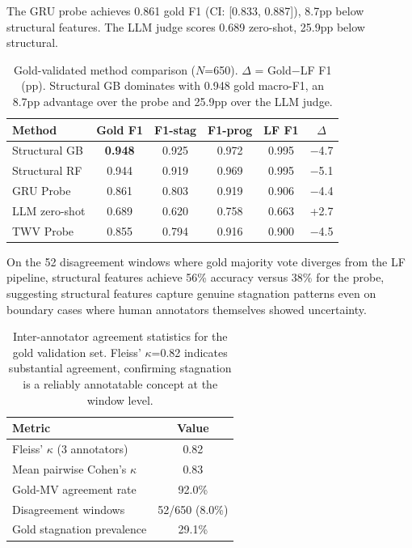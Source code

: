 \documentclass[11pt,a4paper]{article}
\begin{document}
The GRU probe achieves 0.861 gold F1 (CI: [0.833, 0.887]), 8.7pp below structural features.
The LLM judge scores 0.689 zero-shot, 25.9pp below structural.

\begin{table}[t]
\centering
\small
\begin{tabular}{lccccc}
\toprule
\textbf{Method} & \textbf{Gold F1} & \textbf{F1-stag} & \textbf{F1-prog} & \textbf{LF F1} & \textbf{$\Delta$} \\
\midrule
Structural GB   & \textbf{0.948} & 0.925 & 0.972 & 0.995 & $-$4.7 \\
Structural RF   & 0.944 & 0.919 & 0.969 & 0.995 & $-$5.1 \\
GRU Probe       & 0.861 & 0.803 & 0.919 & 0.906 & $-$4.4 \\
LLM zero-shot   & 0.689 & 0.620 & 0.758 & 0.663 & +2.7 \\
TWV Probe       & 0.855 & 0.794 & 0.916 & 0.900 & $-$4.5 \\
\bottomrule
\end{tabular}
\caption{Gold-validated method comparison ($N$=650). $\Delta$ = Gold$-$LF F1 (pp). Structural GB dominates with 0.948 gold macro-F1, an 8.7pp advantage over the probe and 25.9pp over the LLM judge.}
\label{tab:gold}
\end{table}

On the 52 disagreement windows where gold majority vote diverges from the LF pipeline, structural features achieve 56\% accuracy versus 38\% for the probe, suggesting structural features capture genuine stagnation patterns even on boundary cases where human annotators themselves showed uncertainty.

\begin{table}[t]
\centering
\small
\begin{tabular}{lc}
\toprule
\textbf{Metric} & \textbf{Value} \\
\midrule
Fleiss' $\kappa$ (3 annotators)    & 0.82 \\
Mean pairwise Cohen's $\kappa$     & 0.83 \\
Gold-MV agreement rate             & 92.0\% \\
Disagreement windows               & 52/650 (8.0\%) \\
Gold stagnation prevalence         & 29.1\% \\
\bottomrule
\end{tabular}
\caption{Inter-annotator agreement statistics for the gold validation set. Fleiss' $\kappa$=0.82 indicates substantial agreement, confirming stagnation is a reliably annotatable concept at the window level.}
\label{tab:iaa}
\end{table}
\end{document}
